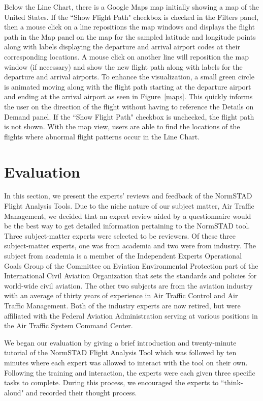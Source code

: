 \documentclass{sig-alternate}
\begin{document}
Below the Line Chart, there is a Google Maps map initially showing a map of the United States.
If the ``Show Flight Path" checkbox is checked in the Filters panel, then a mouse click
on a line repositions the map windows and displays the flight path in the Map panel on the map for the sampled
latitude and longitude points along with labels displaying the departure and arrival 
airport codes at their corresponding locations. A mouse click on
another line will reposition the map window (if necessary) and show the new flight path along with
labels for the departure and arrival airports. To enhance the visualization, a small green circle
is animated moving along with the flight path starting at the departure airport and ending
at the arrival airport as seen in Figure~\ref{maps}.
This quickly informs the user on the direction of the flight
without having to reference the Details on Demand panel. If the ``Show Flight Path" checkbox
is unchecked, the flight path is not shown. With the map view, users are able to find the locations 
of the flights where abnormal flight patterns occur in the Line Chart. 

\section{Evaluation}
\label{sec-expert-review}

In this section, we present the experts' reviews and feedback of the NormSTAD Flight 
Analysis Tools. Due to the niche nature of our subject matter, Air Traffic Management, we decided
that an expert review aided by a questionnaire would be the best way to get detailed
information pertaining to the NormSTAD tool. Three subject-matter experts were selected
to be reviewers. Of these three subject-matter experts, one was from academia
and two were from industry. The subject from academia is a member of the 
Independent Experts Operational Goals Group of the 
Committee on Eviation Environmental Protection part of the International
Civil Aviation Organization that sets the standards and policies for world-wide
civil aviation. The other two subjects are from the aviation industry with 
an average of thirty years of experience in Air Traffic Control and Air Traffic
Management. Both of the industry experts are now retired,
but were affiliated with the Federal 
Aviation Administration serving at various positions in the Air Traffic
System Command Center.

We began our evaluation by giving a brief introduction and twenty-minute
tutorial of the NormSTAD Flight Analysis Tool which was followed by ten minutes where
each expert was allowed to interact with the tool on their own. Following the training
and interaction, the experts were each given three specific tasks to complete. 
During this process, we encouraged the experts to ``think-aloud" and recorded their 
thought process. 
\end{document}
